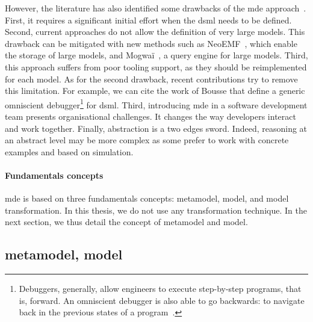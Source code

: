 However, the literature has also identified some drawbacks of the \gls{mde} approach~\cite{DBLP:conf/ifm/Kent02, DBLP:conf/uml/BakerLW05, DBLP:conf/models/WhittleHRBH13, DBLP:conf/icse/HutchinsonRW11}.
First, it requires a significant initial effort when the \gls{dsml} needs to be defined.
Second, current approaches do not allow the definition of very large \glspl{model}.
This drawback can be mitigated with new methods such as NeoEMF~\cite{DBLP:conf/ecmdafa/BenelallamGSTL14, DBLP:journals/scp/DanielSBTVGC17}, which enable the storage of large \glspl{model},  and Mogwaï~\cite{DBLP:conf/rcis/DanielSC16}, a query engine for large \glspl{model}.
Third, this approach suffers from poor tooling support, as they should be reimplemented for each \gls{model}.
As for the second drawback, recent contributions try to remove this limitation.
For example, we can cite the work of Bousse \etal \cite{DBLP:journals/jss/BousseLCWB18} that define a generic omniscient debugger\footnote{Debuggers, generally, allow engineers to execute step-by-step programs, that is, forward. An omniscient debugger is also able to go backwards: to navigate back in the previous states of a program~\cite{DBLP:journals/corr/cs-SE-0310016}.} for \gls{dsml}.
Third, introducing \gls{mde} in a software development team presents organisational challenges.
It changes the way developers interact and work together.
Finally, abstraction is a two edges sword.
Indeed, reasoning at an abstract level may be more complex as some prefer to work with concrete examples and based on simulation.

\paragraph{Fundamentals concepts}
\gls{mde} is based on three fundamentals concepts: \gls{metamodel}, \gls{model}, and model transformation.
In this thesis, we do not use any transformation technique.
In the next section, we thus detail the concept of \gls{metamodel} and \gls{model}.

\subsection[Metamodel, model]{\Gls{metamodel}, \gls{model}}

